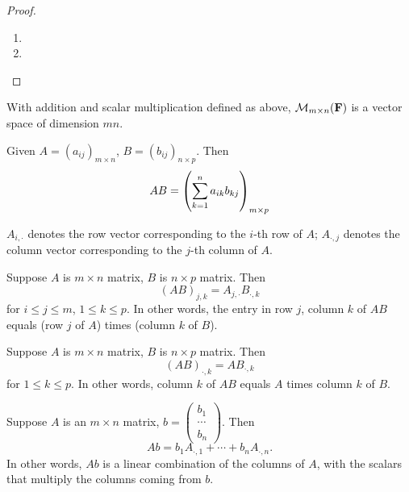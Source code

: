 \begin{proof} \
\begin{enumerate}[label=(\roman*)]
\item 
\item 
\end{enumerate}
\end{proof}

\begin{proposition}
With addition and scalar multiplication defined as above, $\mathcal{M}_{m\times n}(\mathbf F)$ is a vector space of dimension $mn$.
\end{proposition}

\begin{definition}
Given $A=(a_{ij})_{m\times n}$, $B=(b_{ij})_{n\times p}$. Then
\[AB=\left(\sum_{k=1}^{n}a_{ik}b_{kj}\right)_{m\times p}\]
\end{definition}

\begin{notation}
$A_{i,\cdot}$ denotes the row vector corresponding to the $i$-th row of $A$; $A_{\cdot,j}$ denotes the column vector corresponding to the $j$-th column of $A$.
\end{notation}

\begin{proposition}
Suppose $A$ is $m\times n$ matrix, $B$ is $n\times p$ matrix. Then
\[(AB)_{j,k}=A_{j,\cdot}B_{\cdot,k}\]
for $i\le j\le m$, $1\le k\le p$. In other words, the entry in row $j$, column $k$ of $AB$ equals (row $j$ of $A$) times (column $k$ of $B$).
\end{proposition}

\begin{proposition}
Suppose $A$ is $m\times n$ matrix, $B$ is $n\times p$ matrix. Then
\[(AB)_{\cdot,k}=AB_{\cdot,k}\]
for $1\le k\le p$. In other words, column $k$ of $AB$ equals $A$ times column $k$ of $B$.
\end{proposition}

\begin{proposition}
Suppose $A$ is an $m\times n$ matrix, $b=\begin{pmatrix}
b_1\\\cdots\\b_n
\end{pmatrix}$. Then
\[Ab=b_1A_{\cdot,1}+\cdots+b_nA_{\cdot,n}.\]
In other words, $Ab$ is a linear combination of the columns of $A$, with the scalars that multiply the columns coming from $b$.
\end{proposition}

